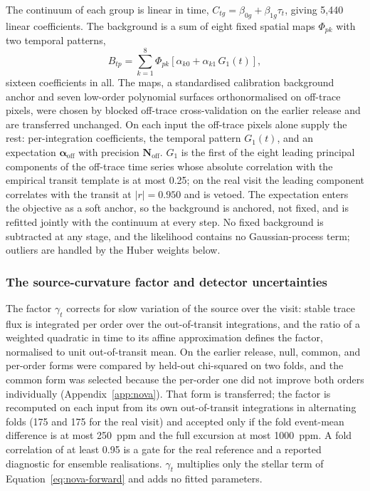 The continuum of each group is linear in time,
$C_{tg}=\beta_{0g}+\beta_{1g}\tau_t$, giving 5{,}440 linear coefficients.
The background is a sum of eight fixed spatial maps $\Phi_{pk}$ with two
temporal patterns,
\begin{equation}
 B_{tp}=\sum_{k=1}^{8}\Phi_{pk}
 \left[\alpha_{k0}+\alpha_{k1}\,G_1(t)\right],
 \label{eq:background-model}
\end{equation}
sixteen coefficients in all. The maps, a standardised calibration
background anchor and seven low-order polynomial surfaces orthonormalised
on off-trace pixels, were chosen by blocked off-trace cross-validation
on the earlier release and are transferred unchanged. On each input the
off-trace pixels alone supply the rest: per-integration coefficients,
the temporal pattern $G_1(t)$, and an expectation
$\bm{\alpha}_{\mathrm{off}}$ with precision $\bm{N}_{\mathrm{off}}$.
$G_1$ is the first of the eight leading principal components of the
off-trace time series whose absolute correlation with the empirical
transit template is at most 0.25; on the real visit the leading component
correlates with the transit at $|r|=0.950$ and is vetoed. The
expectation enters the objective as a soft anchor, so the background is
anchored, not fixed, and is refitted jointly with the continuum at every
step. No fixed background is subtracted at any stage, and the likelihood
contains no Gaussian-process term; outliers are handled by the Huber
weights below.

\subsubsection{The source-curvature factor and detector uncertainties}


The factor $\gamma_t$ corrects for slow variation of the source over the
visit: stable trace flux is integrated per order over the out-of-transit
integrations, and the ratio of a weighted quadratic in time to its affine
approximation defines the factor, normalised to unit out-of-transit mean.
On the earlier release, null, common, and per-order forms were compared
by held-out chi-squared on two folds, and the common form was selected
because the per-order one did not improve both orders individually
(Appendix~\ref{app:nova}). That form is transferred; the factor is
recomputed on each input from its own out-of-transit integrations in
alternating folds (175 and 175 for the real visit) and accepted only if
the fold event-mean difference is at most 250~ppm and the full excursion
at most 1000~ppm. A fold correlation of at least 0.95 is a gate for the
real reference and a reported diagnostic for ensemble realisations.
$\gamma_t$ multiplies only the stellar term of
Equation~\ref{eq:nova-forward} and adds no fitted parameters.

